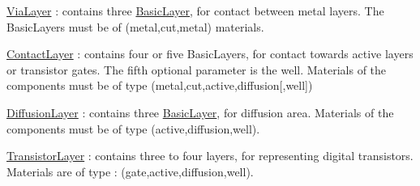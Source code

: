 \begin{DoxyItemize}
\begin{DoxyItemize}
\item \hyperlink{classHurricane_1_1ViaLayer}{Via\+Layer} \+: contains three \hyperlink{classHurricane_1_1BasicLayer}{Basic\+Layer}, for contact between metal layers. The Basic\+Layers must be of {\ttfamily }(metal,cut,metal) materials. 
\item \hyperlink{classHurricane_1_1ContactLayer}{Contact\+Layer} \+: contains four or five Basic\+Layers, for contact towards active layers or transistor gates. The fifth optional parameter is the well. Materials of the components must be of type {\ttfamily }(metal,cut,active,diffusion\mbox{[},well\mbox{]}) 
\item \hyperlink{classHurricane_1_1DiffusionLayer}{Diffusion\+Layer} \+: contains three \hyperlink{classHurricane_1_1BasicLayer}{Basic\+Layer}, for diffusion area. Materials of the components must be of type {\ttfamily }(active,diffusion,well). 
\item \hyperlink{classHurricane_1_1TransistorLayer}{Transistor\+Layer} \+: contains three to four layers, for representing digital transistors. Materials are of type \+: {\ttfamily }(gate,active,diffusion,well). 
\end{DoxyItemize}
\end{DoxyItemize}

